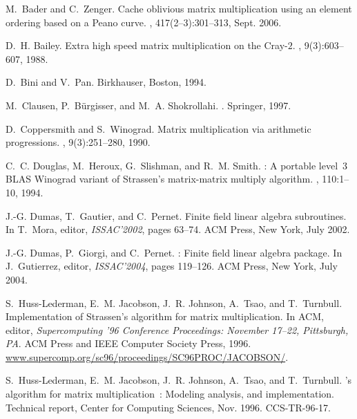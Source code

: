 \documentclass{article}
\begin{document}
\begin{thebibliography}{10}

M.~Bader and C.~Zenger.
\newblock Cache oblivious matrix multiplication using an element ordering based
  on a {Peano} curve.
, 417(2--3):301--313, Sept.
  2006.

D.~H. Bailey.
\newblock Extra high speed matrix multiplication on the {C}ray-$2$.
,
  9(3):603--607, 1988.

D.~Bini and V.~Pan.
\newblock Birkhauser, Boston, 1994.

M.~Clausen, P.~{B\"urgisser}, and M.~A. Shokrollahi.
.
\newblock Springer, 1997.

D.~Coppersmith and S.~Winograd.
\newblock Matrix multiplication via arithmetic progressions.
, 9(3):251--280, 1990.

C.~C. Douglas, M.~Heroux, G.~Slishman, and R.~M. Smith.
: A portable level~3 {BLAS} {Winograd} variant of {Strassen}'s
  matrix-matrix multiply algorithm.
, 110:1--10, 1994.

J.-G. Dumas, T.~Gautier, and C.~Pernet.
\newblock Finite field linear algebra subroutines.
\newblock In T.~Mora, editor, {\em {ISSAC}'2002}, pages 63--74. ACM Press, New
  York, July 2002.

J.-G. Dumas, P.~Giorgi, and C.~Pernet.
: Finite field linear algebra package.
\newblock In J.~Gutierrez, editor, {\em {ISSAC}'2004}, pages 119--126. ACM
  Press, New York, July 2004.

S.~Huss-Lederman, E.~M. Jacobson, J.~R. Johnson, A.~Tsao, and T.~Turnbull.
\newblock Implementation of {Strassen}'s algorithm for matrix multiplication.
\newblock In {ACM}, editor, {\em Supercomputing '96 Conference Proceedings:
  November 17--22, Pittsburgh, {PA}}. ACM Press and IEEE Computer Society
  Press, 1996.
\newblock \url{www.supercomp.org/sc96/proceedings/SC96PROC/JACOBSON/}.

S.~Huss-Lederman, E.~M. Jacobson, J.~R. Johnson, A.~Tsao, and T.~Turnbull.
's algorithm for matrix multiplication~: Modeling analysis,
  and implementation.
\newblock Technical report, Center for Computing Sciences, Nov. 1996.
\newblock CCS-TR-96-17.


\end{thebibliography}
\end{document}
